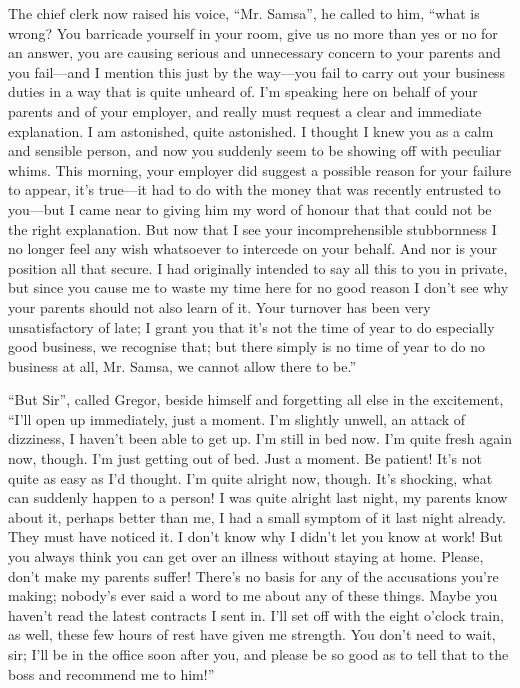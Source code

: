 The chief clerk now raised his voice, “Mr. Samsa”, he called to him,
“what is wrong? You barricade yourself in your room, give us no more
than yes or no for an answer, you are causing serious and unnecessary
concern to your parents and you fail—and I mention this just by the
way—you fail to carry out your business duties in a way that is quite
unheard of. I’m speaking here on behalf of your parents and of your
employer, and really must request a clear and immediate explanation. I
am astonished, quite astonished. I thought I knew you as a calm and
sensible person, and now you suddenly seem to be showing off with
peculiar whims. This morning, your employer did suggest a possible
reason for your failure to appear, it’s true—it had to do with the
money that was recently entrusted to you—but I came near to giving him
my word of honour that that could not be the right explanation. But now
that I see your incomprehensible stubbornness I no longer feel any wish
whatsoever to intercede on your behalf. And nor is your position all
that secure. I had originally intended to say all this to you in
private, but since you cause me to waste my time here for no good
reason I don’t see why your parents should not also learn of it. Your
turnover has been very unsatisfactory of late; I grant you that it’s
not the time of year to do especially good business, we recognise that;
but there simply is no time of year to do no business at all, Mr.
Samsa, we cannot allow there to be.”

“But Sir”, called Gregor, beside himself and forgetting all else in the
excitement, “I’ll open up immediately, just a moment. I’m slightly
unwell, an attack of dizziness, I haven’t been able to get up. I’m
still in bed now. I’m quite fresh again now, though. I’m just getting
out of bed. Just a moment. Be patient! It’s not quite as easy as I’d
thought. I’m quite alright now, though. It’s shocking, what can
suddenly happen to a person! I was quite alright last night, my parents
know about it, perhaps better than me, I had a small symptom of it last
night already. They must have noticed it. I don’t know why I didn’t let
you know at work! But you always think you can get over an illness
without staying at home. Please, don’t make my parents suffer! There’s
no basis for any of the accusations you’re making; nobody’s ever said a
word to me about any of these things. Maybe you haven’t read the latest
contracts I sent in. I’ll set off with the eight o’clock train, as
well, these few hours of rest have given me strength. You don’t need to
wait, sir; I’ll be in the office soon after you, and please be so good
as to tell that to the boss and recommend me to him!”

